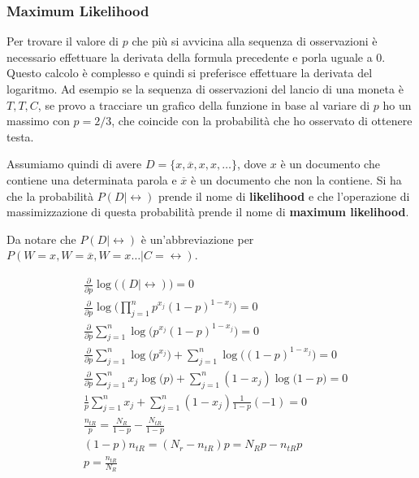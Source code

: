 
\subsubsection{Maximum Likelihood}

Per trovare il valore di $p$ che più si avvicina alla sequenza di osservazioni è necessario effettuare la derivata della formula precedente e porla uguale a 0. Questo calcolo è complesso e quindi si preferisce effettuare la derivata del logaritmo.
Ad esempio se la sequenza di osservazioni del lancio di una moneta è $T,T, C$, se provo a tracciare un grafico della funzione in base al variare di $p$ ho un massimo con $p = 2/3$, che coincide con la probabilità che ho osservato di ottenere testa.

Assumiamo quindi di avere $D = \{x, \overline{x}, x, x, \ldots \}$, dove $x$ è un documento che contiene una determinata parola e $\overline{x}$ è un documento che non la contiene.
Si ha che la probabilità $P(D|\rel)$ prende il nome di \textbf{likelihood} e che l'operazione di massimizzazione di questa probabilità prende il nome di \textbf{maximum likelihood}.

Da notare che $P(D|\rel)$ è un'abbreviazione per $P(W = x, W = \overline{x}, W = x \ldots | C = \rel)$.

\begin{align*}
	&\frac{\partial}{\partial p} \log \Big( (D|\rel) \Big) = 0\\
	&\frac{\partial}{\partial p} \log \Big( \prod\limits_{j = 1}^n p^{x_j}(1-p)^{1-x_j} \Big) = 0\\
	&\frac{\partial}{\partial p} \sum\limits_{j = 1}^n \log \Big( p^{x_j}(1-p)^{1-x_j} \Big) = 0 \\
	&\frac{\partial}{\partial p} \sum\limits_{j = 1}^n \log \Big( p^{x_j}\Big) + \sum\limits_{j = 1}^n \log \Big((1-p)^{1-x_j} \Big) = 0 \\
	&\frac{\partial}{\partial p} \sum\limits_{j = 1}^n x_j \log \Big( p\Big) + \sum\limits_{j = 1}^n (1-x_j)\log \Big(1-p \Big) = 0 \\
	&\frac{1}{p}\sum\limits_{j = 1}^n x_j + \sum\limits_{j = 1}^n (1-x_j) \frac{1}{1-p}(-1)= 0 \\
	&\frac{n_{tR}}{p}  =  \frac{N_R}{1-p} - \frac{N_{tR}}{1-p}\\
	&(1-p)n_{tR} = (N_r - n_{tR}) p  = N_Rp - n_{tR}p\\
	&\boxed{p = \frac{n_{tR}}{N_R}}
\end{align*}

